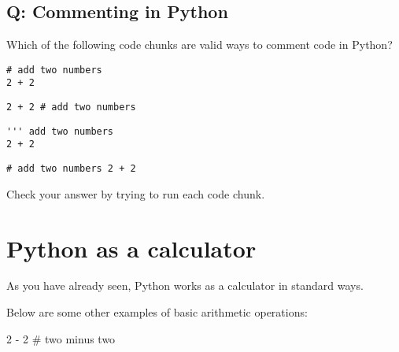 \documentclass[
  letterpaper,
  DIV=11,
  numbers=noendperiod]{scrreprt}
\newenvironment{Shaded}{\begin{snugshade}}{\end{snugshade}}
\newcommand{\CommentTok}[1]{\textcolor[rgb]{0.37,0.37,0.37}{#1}}
\newcommand{\DecValTok}[1]{\textcolor[rgb]{0.68,0.00,0.00}{#1}}
\newcommand{\OperatorTok}[1]{\textcolor[rgb]{0.37,0.37,0.37}{#1}}
\begin{document}
\begin{tcolorbox}[enhanced jigsaw, colframe=quarto-callout-tip-color-frame, opacityback=0, titlerule=0mm, bottomrule=.15mm, breakable, leftrule=.75mm, colbacktitle=quarto-callout-tip-color!10!white, title=\textcolor{quarto-callout-tip-color}{\faLightbulb}\hspace{0.5em}{Practice}, rightrule=.15mm, coltitle=black, opacitybacktitle=0.6, colback=white, left=2mm, arc=.35mm, toptitle=1mm, bottomtitle=1mm, toprule=.15mm]

\subsection{Q: Commenting in Python}\label{q-commenting-in-python}

Which of the following code chunks are valid ways to comment code in
Python?

\begin{verbatim}
# add two numbers
2 + 2
\end{verbatim}

\begin{verbatim}
2 + 2 # add two numbers
\end{verbatim}

\begin{verbatim}
''' add two numbers
2 + 2
\end{verbatim}

\begin{verbatim}
# add two numbers 2 + 2
\end{verbatim}

Check your answer by trying to run each code chunk.

\end{tcolorbox}

\section{Python as a calculator}\label{python-as-a-calculator}

As you have already seen, Python works as a calculator in standard ways.

Below are some other examples of basic arithmetic operations:

\begin{Shaded}
\begin{Highlighting}[]
\DecValTok{2} \OperatorTok{{-}} \DecValTok{2} \CommentTok{\# two minus two}
\end{Highlighting}
\end{Shaded}
\end{document}
